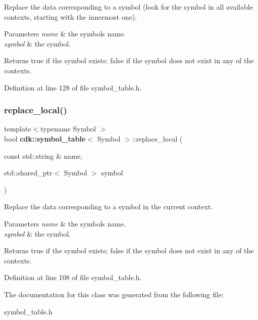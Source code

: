 Replace the data corresponding to a symbol (look for the symbol in all available contexts, starting with the innermost one).


\begin{DoxyParams}{Parameters}
{\em name} & the symbol\textquotesingle{}s name. \\
\hline
{\em symbol} & the symbol. \\
\hline
\end{DoxyParams}
\begin{DoxyReturn}{Returns}
{\ttfamily true} if the symbol exists; {\ttfamily false} if the symbol does not exist in any of the contexts. 
\end{DoxyReturn}


Definition at line 128 of file symbol\+\_\+table.\+h.

\mbox{\label{classcdk_1_1symbol__table_af15e8e2e900c8661a94f72a71978f16e}} 
\subsubsection{replace\+\_\+local()}
{\footnotesize\ttfamily template$<$typename Symbol $>$ \\
bool \textbf{ cdk\+::symbol\+\_\+table}$<$ Symbol $>$\+::replace\+\_\+local (\begin{DoxyParamCaption}\item[{const std\+::string \&}]{name,  }\item[{std\+::shared\+\_\+ptr$<$ Symbol $>$}]{symbol }\end{DoxyParamCaption})\hspace{0.3cm}{\ttfamily [inline]}}

Replace the data corresponding to a symbol in the current context.


\begin{DoxyParams}{Parameters}
{\em name} & the symbol\textquotesingle{}s name. \\
\hline
{\em symbol} & the symbol. \\
\hline
\end{DoxyParams}
\begin{DoxyReturn}{Returns}
{\ttfamily true} if the symbol exists; {\ttfamily false} if the symbol does not exist in any of the contexts. 
\end{DoxyReturn}


Definition at line 108 of file symbol\+\_\+table.\+h.



The documentation for this class was generated from the following file\+:\begin{DoxyCompactItemize}
\item 
symbol\+\_\+table.\+h\end{DoxyCompactItemize}
